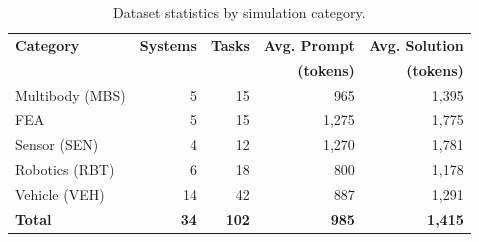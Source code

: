 \begin{table}[h!]
    \centering
    \caption{Dataset statistics by simulation category.}
    \label{tab:category_complexity}
    \begin{tabular}{l r r r r}
        \toprule
        \textbf{Category} & \textbf{Systems} & \textbf{Tasks} & \textbf{Avg. Prompt} & \textbf{Avg. Solution} \\
        & & & \textbf{(tokens)} & \textbf{(tokens)} \\
        \midrule
        Multibody (MBS) & 5 & 15 & 965 & 1,395 \\
        FEA & 5 & 15 & 1,275 & 1,775 \\
        Sensor (SEN) & 4 & 12 & 1,270 & 1,781 \\
        Robotics (RBT) & 6 & 18 & 800 & 1,178 \\
        Vehicle (VEH) & 14 & 42 & 887 & 1,291 \\
        \midrule
        \textbf{Total} & \textbf{34} & \textbf{102} & \textbf{985} & \textbf{1,415} \\
        \bottomrule
    \end{tabular}
\end{table}

